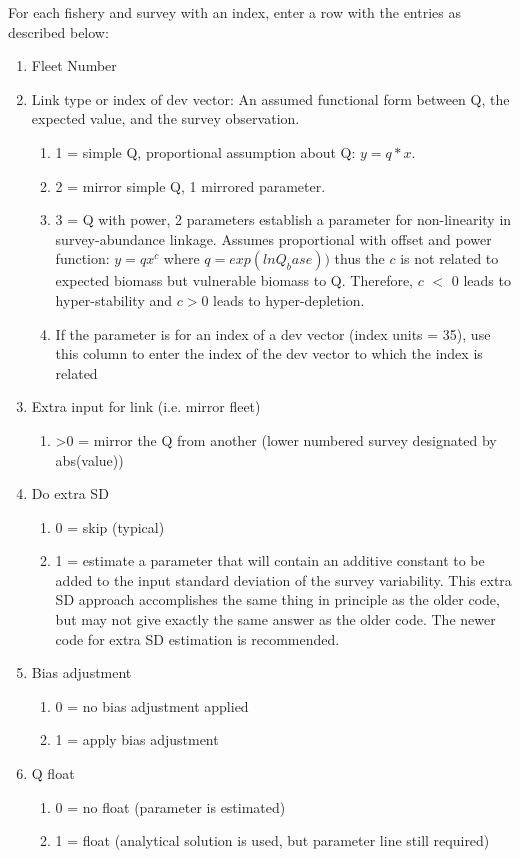 For each fishery and survey with an index, enter a row with the entries as described below:

\begin{enumerate}
	\item Fleet Number
	\item Link type or index of dev vector: An assumed functional form between Q, the expected value, and the survey observation.
	\begin{enumerate}
		\item 1 = simple Q, proportional assumption about Q: $y=q*x$.
		\item 2 = mirror simple Q, 1 mirrored parameter.  
		\item 3 = Q with power, 2 parameters establish a parameter for non-linearity in survey-abundance linkage.  Assumes proportional with offset and power function: $y=qx^c$ where $q = exp(lnQ_base))$ thus the $c$ is not related to expected biomass but vulnerable biomass to Q.  Therefore, $c$ $<$ 0 leads to hyper-stability and $c > 0$ leads to hyper-depletion.
		\item If the parameter is for an index of a dev vector (index units = 35), use this column to enter the index of the dev vector to which the index is related
	\end{enumerate}
	\item Extra input for link (i.e. mirror fleet)
	\begin{enumerate}
		\item >0 = mirror the Q from another (lower numbered survey designated by abs(value))
	\end{enumerate}
	\item Do extra SD
	\begin{enumerate}
		\item 0 = skip (typical)
		\item 1 = estimate a parameter that will contain an additive constant to be added to the input standard deviation of the survey variability.  This extra SD approach accomplishes the same thing in principle as the older code, but may not give exactly the same answer as the older code.  The newer code for extra SD estimation is recommended.
	\end{enumerate}
	\item Bias adjustment
	\begin{enumerate}
		\item 0 = no bias adjustment applied
		\item 1 = apply bias adjustment
	\end{enumerate}
	\item Q float
	\begin{enumerate}
		\item 0 = no float (parameter is estimated)
		\item 1 = float (analytical solution is used, but parameter line still required)
	\end{enumerate}
\end{enumerate}



